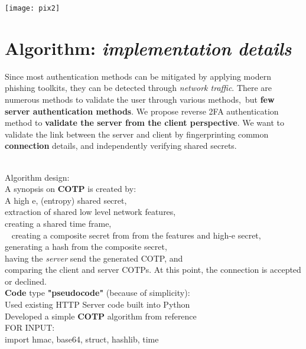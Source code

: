 \documentclass[a4paper, 11pt]{article} 				%
\begin{document}
\texttt{[image: pix2]}


\section{Algorithm: \textit{implementation details}}
Since most authentication methods can be mitigated by applying modern phishing toolkits,
they can be detected through \textit{network traffic}.
There are numerous methods to validate the user through various methods, but \textbf{few server authentication methods}.
We propose reverse 2FA authentication method to \textbf{validate the server from the client perspective}.
We want to validate the link between the server and client by fingerprinting common \textbf{connection} details, and independently verifying shared secrets.\\ 

\noindent
Algorithm design:\\
A synopsis on \textbf{COTP} is created by:\\
\noindent
A high e, (entropy) shared secret,\\
extraction of shared low level network features,\\
creating a shared time frame,\\ 
creating a composite secret from from the features and high-e secret,\\
generating a hash from the composite secret,\\
having the \textit{server} send the generated COTP, and\\
comparing the client and server COTPs. At this point, the connection is accepted or declined.\\

\noindent
\textbf{Code} type \textbf{"pseudocode"} (because of simplicity):\\
\noindent
Used existing HTTP Server code built into Python\\
\noindent
Developed a simple \textbf{COTP} algorithm from reference\\

\noindent
FOR INPUT:\\
\noindent
import hmac, base64, struct, hashlib, time\\
\end{document}
